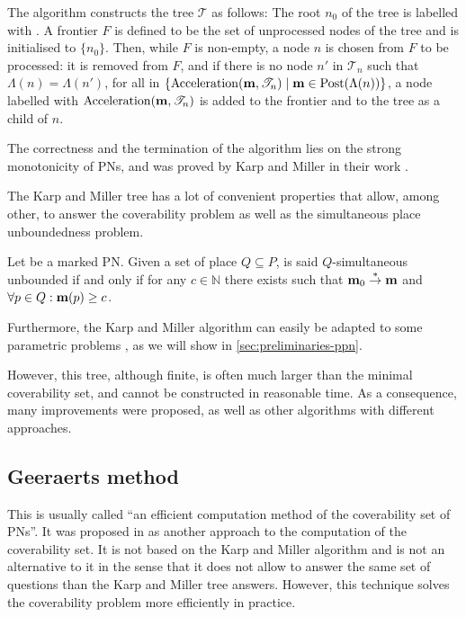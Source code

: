 The algorithm constructs the tree $\mathcal{T}$ as follows:
The root $n_0$ of the tree is labelled with \mari.
A frontier $F$ is defined to be the set of unprocessed nodes of the tree and is initialised to $\{n_0\}$.
Then, while $F$ is non-empty, a node $n$ is chosen from $F$ to be processed:
it is removed from $F$, and if there is no node $n'$ in $\mathscr{T}_n$ such that $\Lambda(n) = \Lambda(n')$, for all \omark in $\{\operatorname{Acceleration}(\mathbf{m}, \mathscr{T}_n) \mid \mathbf{m} \in \operatorname{Post}(\Lambda(n))\}$, a node labelled with $\operatorname{Acceleration}(\mathbf{m}, \mathscr{T}_n)$ is added to the frontier and to the tree as a child of $n$.

The correctness and the termination of the algorithm lies on the strong monotonicity of \acp{PN}, and was proved by Karp and Miller in their work \cite{Karp69}.

The Karp and Miller tree has a lot of convenient properties that allow, among other, to answer the coverability problem as well as the simultaneous place unboundedness problem.

\begin{defi}
  Let \NPTm be a marked \ac{PN}.
  Given a set of place $Q \subseteq P$, \N is said $Q$-simultaneous unbounded if and only if for any $c \in \mathbb{N}$ there exists \mar such that $\mathbf{m}_0 \stackrel{*}{\to} \mathbf{m}$ and $\forall p \in Q : \mathbf{m}(p) \geq c$.
\end{defi}

Furthermore, the Karp and Miller algorithm can easily be adapted to some parametric problems \cite{David17}, as we will show in \autoref{sec:preliminaries-ppn}.

However, this tree, although finite, is often much larger than the minimal coverability set, and cannot be constructed in reasonable time.
As a consequence, many improvements were proposed, as well as other algorithms with different approaches.

\subsection{Geeraerts method}
\label{sec:eff}

This is usually called ``an efficient computation method of the coverability set of \acp{PN}''.
It was proposed in \cite{Geeraerts07thesis, Geeraerts07} as another approach to the computation of the coverability set.
It is not based on the Karp and Miller algorithm and is not an alternative to it in the sense that it does not allow to answer the same set of questions than the Karp and Miller tree answers.
However, this technique solves the coverability problem more efficiently in practice.

